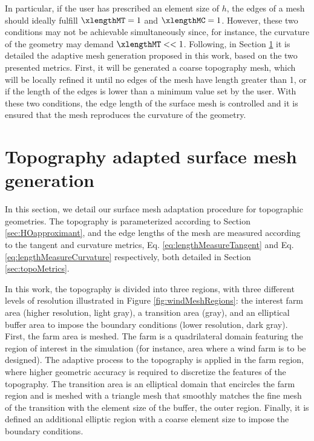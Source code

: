 \documentclass[1p]{elsarticle}
\begin{document}
In particular, if the user has prescribed an element size of $h$, the edges of a mesh should ideally fulfill $\xlengthMT=1$ and $\xlengthMC= 1$.
However, these two conditions may not be achievable simultaneously since, for instance, the curvature of the geometry may demand $\xlengthMT<<1$.
Following, in Section \ref{sec:surface} it is detailed the adaptive mesh generation proposed in this work, based on the two presented metrics. First, it will be generated a coarse topography mesh, which will be locally refined it until no edges of the mesh have length greater than 1, or if the  length of the edges is lower than a minimum value set by the user.
With these two conditions, the edge length of the surface mesh is controlled and it is ensured that the mesh  reproduces the curvature of the geometry.
\color{black}


\section{Topography adapted surface mesh generation} 
\label{sec:surface}

In this section, we detail our surface mesh adaptation procedure for topographic geometries. 
The topography is parameterized according to Section \ref{sec:HOapproximant}, and the edge lengths of the mesh are measured according to the tangent and curvature metrics, Eq. \eqref{eq:lengthMeasureTangent} and Eq.  \eqref{eq:lengthMeasureCurvature} respectively, both detailed in Section \ref{sec:topoMetrics}.

In this work, the topography is divided into three regions, with three different levels of resolution illustrated in Figure \ref{fig:windMeshRegions}: the interest  farm area (higher resolution, light gray), a transition area (gray), and an elliptical buffer area to impose the boundary conditions (lower resolution, dark gray).
First, the farm area is meshed. The farm is a quadrilateral domain featuring the region of interest in the simulation (for instance, area where a wind farm is to be designed). 
The adaptive process to the topography is applied in the farm region, where  higher geometric accuracy is required to discretize the features of the topography.
The transition area  is an elliptical domain that encircles the farm region and is meshed with a triangle mesh that  smoothly matches the fine mesh of the transition with the element size of the buffer, the outer region. 
Finally, it is defined an additional elliptic region with a coarse element size  to impose the boundary conditions. 
\end{document}
